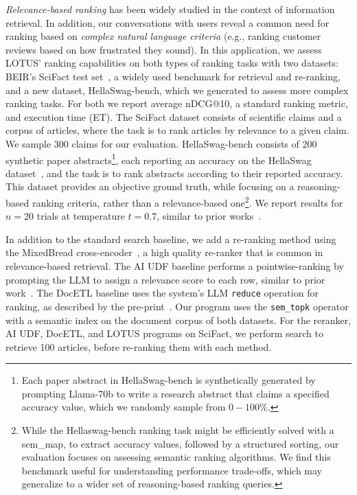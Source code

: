 \emph{Relevance-based ranking} has been widely studied in the context of information retrieval. In addition, our conversations with \sys users reveal a common need for ranking based on \emph{complex natural language criteria} (e.g., ranking customer reviews based on how frustrated they sound). In this application, we assess LOTUS' ranking capabilities on both types of ranking tasks with two datasets: BEIR's SciFact test set~\cite{thakur_beir_2021}, a widely used benchmark for retrieval and re-ranking, and a new dataset, HellaSwag-bench, which we generated to assess more complex ranking tasks. For both we report average nDCG@10, a standard ranking metric, and execution time (ET).
The SciFact dataset consists of scientific claims and a corpus of articles, where the task is to rank articles by relevance to a given claim. We sample 300 claims for our evaluation. HellaSwag-bench consists of 200 synthetic paper abstracts\footnote{Each paper abstract in HellaSwag-bench is synthetically generated by prompting Llama-70b to write a research abstract that claims a specified accuracy value, which we randomly sample from $0-100\%$.}, each reporting an accuracy on the HellaSwag~ dataset~\cite{zellers_hellaswag_2019}, and the task is to rank abstracts according to their reported accuracy. This dataset provides an objective ground truth, while focusing on a reasoning-based ranking criteria, rather than a relevance-based one\footnote{While the Hellaswag-bench ranking task might be efficiently solved with a sem\_map, to extract accuracy values, followed by a structured sorting, our evaluation focuses on assessing semantic ranking algorithms. We find this benchmark useful for understanding performance trade-offs, which may generalize to a wider set of reasoning-based ranking queries.}.
We report results for $n=20$ trials at temperature $t=0.7$, similar to prior works~\cite{khattab_dspy_2023}.




 In addition to the standard search baseline, we add a re-ranking method using the MixedBread cross-encoder~\cite{noauthor_mixedbread-aimxbai-rerank-large-v1_2024}, a high quality re-ranker that is common in relevance-based retrieval. The AI UDF baseline performs a pointwise-ranking by prompting the LLM to assign a relevance score to each row, similar to prior work~\cite{zhuang_beyond_2024}. The DocETL baseline uses the system's LLM \verb|reduce| operation for ranking, as described by the pre-print~\cite{shankar_docetl_2024}.
Our \sys program uses the \verb|sem_topk| operator with a semantic index on the document corpus of both datasets. 
For the reranker, AI UDF, DocETL, and LOTUS programs on SciFact, we perform search to retrieve 100 articles, before re-ranking them with each method.



